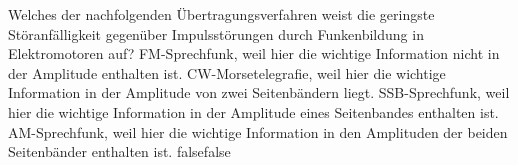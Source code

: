     {Welches der nachfolgenden Übertragungsverfahren weist die geringste Störanfälligkeit gegenüber Impulsstörungen durch Funkenbildung in Elektromotoren auf?}
    {FM-Sprechfunk, weil hier die wichtige Information nicht in der Amplitude enthalten ist.}
    {CW-Morsetelegrafie, weil hier die wichtige Information in der Amplitude von zwei Seitenbändern liegt.}
    {SSB-Sprechfunk, weil hier die wichtige Information in der Amplitude eines Seitenbandes enthalten ist.}
    {AM-Sprechfunk, weil hier die wichtige Information in den Amplituden der beiden Seitenbänder enthalten ist.}
    {false}{false}